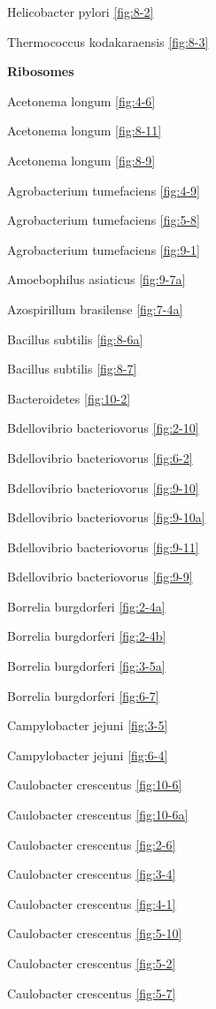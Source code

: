 \documentclass[]{tufte-book}
\begin{document}
Helicobacter pylori \ref{fig:8-2}

Thermococcus kodakaraensis \ref{fig:8-3}

\textbf{Ribosomes}

Acetonema longum \ref{fig:4-6}

Acetonema longum \ref{fig:8-11}

Acetonema longum \ref{fig:8-9}

Agrobacterium tumefaciens \ref{fig:4-9}

Agrobacterium tumefaciens \ref{fig:5-8}

Agrobacterium tumefaciens \ref{fig:9-1}

Amoebophilus asiaticus \ref{fig:9-7a}

Azospirillum brasilense \ref{fig:7-4a}

Bacillus subtilis \ref{fig:8-6a}

Bacillus subtilis \ref{fig:8-7}

Bacteroidetes \ref{fig:10-2}

Bdellovibrio bacteriovorus \ref{fig:2-10}

Bdellovibrio bacteriovorus \ref{fig:6-2}

Bdellovibrio bacteriovorus \ref{fig:9-10}

Bdellovibrio bacteriovorus \ref{fig:9-10a}

Bdellovibrio bacteriovorus \ref{fig:9-11}

Bdellovibrio bacteriovorus \ref{fig:9-9}

Borrelia burgdorferi \ref{fig:2-4a}

Borrelia burgdorferi \ref{fig:2-4b}

Borrelia burgdorferi \ref{fig:3-5a}

Borrelia burgdorferi \ref{fig:6-7}

Campylobacter jejuni \ref{fig:3-5}

Campylobacter jejuni \ref{fig:6-4}

Caulobacter crescentus \ref{fig:10-6}

Caulobacter crescentus \ref{fig:10-6a}

Caulobacter crescentus \ref{fig:2-6}

Caulobacter crescentus \ref{fig:3-4}

Caulobacter crescentus \ref{fig:4-1}

Caulobacter crescentus \ref{fig:5-10}

Caulobacter crescentus \ref{fig:5-2}

Caulobacter crescentus \ref{fig:5-7}
\end{document}
